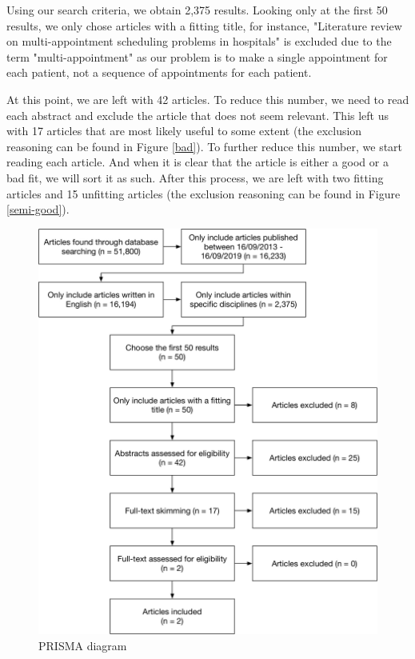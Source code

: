 \documentclass[a4paper,12pt]{article}
\begin{document}
\bigbreak

Using our search criteria, we obtain 2,375 results. Looking only at the first 50 results, we only chose articles with a fitting title, for instance, "Literature review on multi-appointment scheduling problems in hospitals" is excluded due to the term "multi-appointment" as our problem is to make a single appointment for each patient, not a sequence of appointments for each patient.

\bigbreak

At this point, we are left with 42 articles. To reduce this number, we need to read each abstract and exclude the article that does not seem relevant. This left us with 17 articles that are most likely useful to some extent (the exclusion reasoning can be found in Figure \ref{bad}). To further reduce this number, we start reading each article. And when it is clear that the article is either a good or a bad fit, we will sort it as such. After this process, we are left with two fitting articles and 15 unfitting articles (the exclusion reasoning can be found in Figure \ref{semi-good}).


\begin{figure}[H]
    \begin{center}
    \includegraphics[scale=0.5]{PRISMA.pdf}
    \end{center}
    \caption{PRISMA diagram}
    \label{prisma}
\end{figure}
\end{document}
